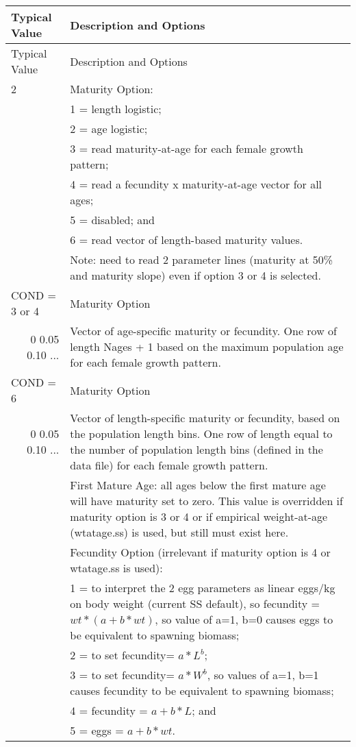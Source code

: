 \begin{longtable}{p{0.5cm} p{2cm} p{13cm}}
	\hline	
	\multicolumn{2}{l}{Typical Value} & Description and Options\Tstrut\Bstrut\\
	\hline
	\endfirsthead

	\hline
	\multicolumn{2}{l}{Typical Value} & Description and Options\Tstrut\Bstrut\\
	\hline
	\endhead
	\hline

	\endfoot
	
	\endlastfoot

	2 & & Maturity Option: \Tstrut\\
	  & & 1 = length logistic;\\
	  & & 2 = age logistic;\\
	  & & 3 = read maturity-at-age for each female growth pattern;\\
	  & & 4 = read a fecundity x maturity-at-age vector for all ages;\\
	  & & 5 = disabled; and \\
	  & & 6 = read vector of length-based maturity values.\\
	  & & Note: need to read 2 parameter lines (maturity at 50\% and maturity slope) even if option 3 or 4 is selected.\Bstrut \\
	\hline

	\multicolumn{2}{l}{COND = 3 or 4} & Maturity Option\Tstrut\\
	\multicolumn{2}{r}{0 0.05 0.10 ...} & Vector of age-specific maturity or fecundity.  One row of length Nages + 1 based on the maximum population age for each female growth pattern. \Bstrut\\
	\multicolumn{2}{l}{COND = 6} & Maturity Option\Tstrut\\
	\multicolumn{2}{r}{0 0.05 0.10 ...} & Vector of length-specific maturity or fecundity, based on the population length bins.  One row of length equal to the number of population length bins (defined in the data file) for each female growth pattern. \Bstrut\\
	\hline
	
	\Tstrut 1  & & First Mature Age: all ages below the first mature age will have maturity set to zero. This value is overridden if maturity option is 3 or 4 or if empirical weight-at-age (wtatage.ss) is used, but still must exist here.  \Bstrut\\
	\hline	  

	\Tstrut 1 & & Fecundity Option (irrelevant if maturity option is 4 or wtatage.ss is used):\\
	  & & 1 = to  interpret the 2 egg parameters as linear eggs/kg on body weight (current SS default),  so fecundity = $wt * (a+b*wt)$,  so value of a=1, b=0 causes eggs to be equivalent to spawning biomass;\\
	  & & 2 = to set fecundity= $a*L^ b$;\\
	  & & 3 = to set fecundity= $a*W^ b$, so values of a=1, b=1 causes fecundity to be equivalent to spawning biomass;\\
	  & & 4 = fecundity = $a+b*L$; and \\
	  & & 5 = eggs = $a+b*wt$.\Bstrut\\
	\hline
\end{longtable}

